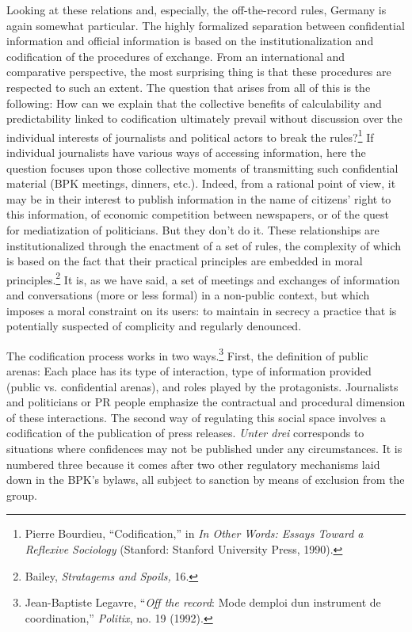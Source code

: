 \documentclass{tufte-handout}
\begin{document}
Looking at these relations and, especially, the off-the-record rules,
Germany is again somewhat particular. The highly formalized separation
between confidential information and official information is based on
the institutionalization and codification of the procedures of exchange.
From an international and comparative perspective, the most surprising
thing is that these procedures are respected to such an extent. The
question that arises from all of this is the following: How can we
explain that the collective benefits of calculability and predictability
linked to codification ultimately prevail without discussion over the
individual interests of journalists and political actors to break the
rules?\footnote{Pierre Bourdieu, ``Codification,'' in \emph{In Other
  Words: Essays Toward a Reflexive Sociology} (Stanford: Stanford
  University Press, 1990).} If individual journalists have various ways
of accessing information, here the question focuses upon those
collective moments of transmitting such confidential material (BPK
meetings, dinners, etc.). Indeed, from a rational point of view, it may
be in their interest to publish information in the name of citizens'
right to this information, of economic competition between newspapers,
or of the quest for mediatization of politicians. But they don't do it.
These relationships are institutionalized through the enactment of a set
of rules, the complexity of which is based on the fact that their
practical principles are embedded in moral principles.\footnote{Bailey,
  \emph{Stratagems and Spoils,} 16.} It is, as we have said, a set of
meetings and exchanges of information and conversations (more or less
formal) in a non-public context, but which imposes a moral constraint on
its users: to maintain in secrecy a practice that is potentially
suspected of complicity and regularly denounced.

The codification process works in two ways.\footnote{Jean-Baptiste
  Legavre, ``\emph{Off the record}: Mode d\textquotesingle emploi
  d\textquotesingle un instrument de coordination,'' \emph{Politix}, no.
  19 (1992).} First, the definition of public arenas: Each place has its
type of interaction, type of information provided (public vs.
confidential arenas), and roles played by the protagonists. Journalists
and politicians or PR people emphasize the contractual and procedural
dimension of these interactions. The second way of regulating this
social space involves a codification of the publication of press
releases. \emph{Unter drei} corresponds to situations where confidences
may not be published under any circumstances. It is numbered three
because it comes after two other regulatory mechanisms laid down in the
BPK's bylaws, all subject to sanction by means of exclusion from the
group.
\end{document}
